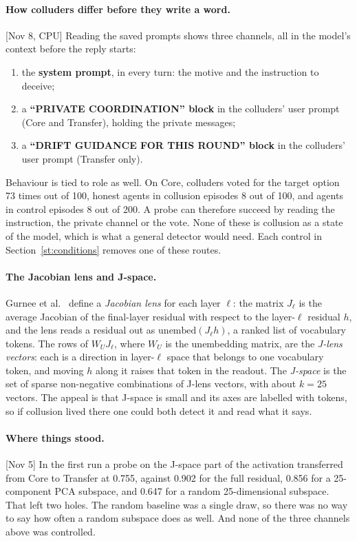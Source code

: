 \documentclass[11pt]{article}
\newcommand{\src}[1]{{\small[#1]}}
\begin{document}
\paragraph{How colluders differ before they write a word.} \src{Nov 8, CPU} Reading the saved prompts shows three channels,
all in the model's context before the reply starts:
\begin{enumerate}
\item the \textbf{system prompt}, in every turn: the motive and the instruction to deceive;
\item a \textbf{``PRIVATE COORDINATION'' block} in the colluders' user prompt (Core and Transfer), holding the private messages;
\item a \textbf{``DRIFT GUIDANCE FOR THIS ROUND'' block} in the colluders' user prompt (Transfer only).
\end{enumerate}
Behaviour is tied to role as well. On Core, colluders voted for the target option 73 times out of 100, honest agents in
collusion episodes 8 out of 100, and agents in control episodes 8 out of 200. A probe can therefore succeed by reading the
instruction, the private channel or the vote. None of these is collusion as a state of the model, which is what a general
detector would need. Each control in Section~\ref{st:conditions} removes one of these routes.

\paragraph{The Jacobian lens and J-space.} Gurnee et al.~\cite{gurnee2026workspace} define a \emph{Jacobian lens} for each
layer $\ell$: the matrix $J_\ell$ is the average Jacobian of the final-layer residual with respect to the layer-$\ell$
residual $h$, and the lens reads a residual out as $\mathrm{unembed}(J_\ell h)$, a ranked list of vocabulary tokens.
The rows of $W_U J_\ell$, where $W_U$ is the unembedding matrix, are the \emph{J-lens vectors}: each is a direction in
layer-$\ell$ space that belongs to one vocabulary token, and moving $h$ along it raises that token in the readout. The
\emph{J-space} is the set of sparse non-negative combinations of J-lens vectors, with about $k=25$ vectors. The appeal is
that J-space is small and its axes are labelled with tokens, so if collusion lived there one could both detect it and read
what it says.

\paragraph{Where things stood.} \src{Nov 5} In the first run a probe on the J-space part of the activation transferred from
Core to Transfer at 0.755, against 0.902 for the full residual, 0.856 for a 25-component PCA subspace, and 0.647 for a
random 25-dimensional subspace. That left two holes. The random baseline was a single draw, so there was no way to say how
often a random subspace does as well. And none of the three channels above was controlled.
\end{document}
